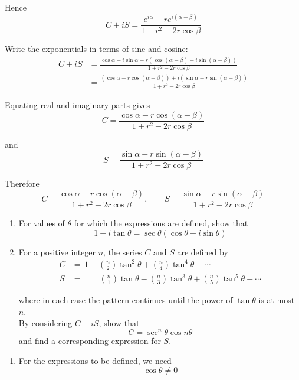 \documentclass[leqno]{article}
\begin{document}
\begin{enumerate}[
  label=\textbf{\arabic*.},
  leftmargin=*,
  topsep=0pt,
  partopsep=0pt,
  parsep=0pt
]
\begin{djsSolution}
Hence
\[
C+iS=\frac{e^{i\alpha}-re^{i(\alpha-\beta)}}{1+r^2-2r\cos\beta}
\]

Write the exponentials in terms of sine and cosine:
\begin{align*}
C+iS&=\frac{\cos\alpha+i\sin\alpha-r\left(\cos(\alpha-\beta)+i\sin(\alpha-\beta)\right)}{1+r^2-2r\cos\beta} \\
&=\frac{\left(\cos\alpha-r\cos(\alpha-\beta)\right)+i\left(\sin\alpha-r\sin(\alpha-\beta)\right)}{1+r^2-2r\cos\beta}
\end{align*}

Equating real and imaginary parts gives
\[
C=\frac{\cos\alpha-r\cos(\alpha-\beta)}{1+r^2-2r\cos\beta}
\]

and
\[
S=\frac{\sin\alpha-r\sin(\alpha-\beta)}{1+r^2-2r\cos\beta}
\]

Therefore
\[
C=\frac{\cos\alpha-r\cos(\alpha-\beta)}{1+r^2-2r\cos\beta},
\qquad
S=\frac{\sin\alpha-r\sin(\alpha-\beta)}{1+r^2-2r\cos\beta}
\]
\end{djsSolution}


\newpage

\questionitem

\begin{enumerate}[label=\textbf{(\roman*)}]
  \item For values of $\theta$ for which the expressions are defined, show that
  \[
  1+i\tan\theta=\sec\theta(\cos\theta+i\sin\theta)
  \]

  \item For a positive integer $n$, the series $C$ and $S$ are defined by
  \begin{align*}
    C&=\,1-\binom{n}{2}\tan^2\theta+\binom{n}{4}\tan^4\theta-\cdots\\[10pt]
  S&=\qquad\binom{n}{1}\tan\theta-\binom{n}{3}\tan^3\theta+\binom{n}{5}\tan^5\theta-\cdots
  \end{align*}

  where in each case the pattern continues until the power of $\tan\theta$ is at most $n$. \\

  By considering $C+iS$, show that
  \[
  C=\sec^n\theta\cos n\theta
  \]
  and find a corresponding expression for $S$. 
\end{enumerate}

\vspace*{10pt}

\begin{djsSolution}
\begin{enumerate}[label=\textbf{(\roman*)}]
\item For the expressions to be defined, we need
\[
\cos\theta\neq 0
\]


\end{enumerate}
\end{djsSolution}
\end{enumerate}
\end{document}
